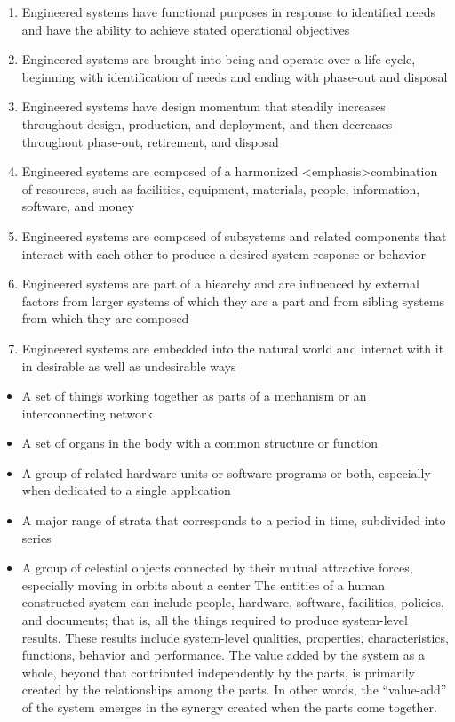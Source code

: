 \begin{enumerate}
	\item Engineered systems have functional purposes in response to identified needs and have the ability to achieve stated operational objectives
	\item Engineered systems are brought into being and operate over a life cycle, beginning with identification of needs and ending with phase-out and disposal
	\item Engineered systems have design momentum that steadily increases throughout design, production, and deployment, and then decreases throughout phase-out, retirement, and disposal
	\item Engineered systems are composed of a harmonized <emphasis>combination of resources, such as facilities, equipment, materials, people, information, software, and money
	\item Engineered systems are composed of subsystems and related components that interact with each other to produce a desired system response or behavior
	\item Engineered systems are part of a hiearchy and are influenced by external factors from larger systems of which they are a part and from sibling systems from which they are composed
	\item Engineered systems are embedded into the natural world and interact with it in desirable as well as undesirable ways
\end{enumerate}

\begin{itemize}
	\item A set of things working together as parts of a mechanism or an interconnecting network
	\item A set of organs in the body with a common structure or function
	\item A group of related hardware units or software programs or both, especially when dedicated to a single application
	\item A major range of strata that corresponds to a period in time, subdivided into series
	\item A group of celestial objects connected by their mutual attractive forces, especially moving in orbits about a center
	The entities of a human constructed system can include people, hardware, software, facilities, policies, and documents; that is, all the things required to produce system-level results. These results include system-level qualities, properties, characteristics, functions, behavior and performance. The value added by the system as a whole, beyond that contributed independently by the parts, is primarily created by the relationships among the parts. In other words, the ``value-add'' of the system emerges in the synergy created when the parts come together.
\end{itemize}

